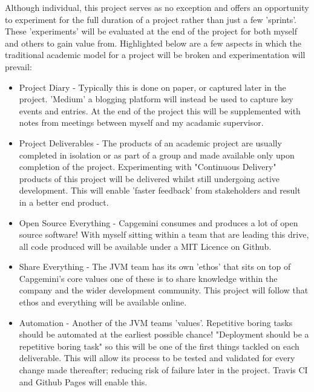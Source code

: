 Although individual, this project serves as no exception and offers an
opportunity to experiment for the full duration of a project rather than just a
few 'sprints'. These 'experiments' will be evaluated at the end of
the project for both myself and others to gain value from. Highlighted below
are a few aspects in which the traditional academic model for a project will
be broken and experimentation will prevail:
 \begin{itemize}
  \item Project Diary - Typically this is done on paper, or captured later in
   the project. 'Medium' a blogging platform will instead be used to
   capture key events and entries. At the end of the project this will be
   supplemented with notes from meetings between myself and my acadamic
   supervisor.
  \item Project Deliverables - The products of an academic project are usually
  completed in isolation or as part of a group and made available only upon
  completion of the project. Experimenting with "Continuous Delivery"
  products of this project will be delivered whilst still undergoing active
  development. This will enable 'faster feedback' from stakeholders and
  result in a better end product.
  \item Open Source Everything - Capgemini consumes and
  produces a lot of open source software! With myself sitting within a team
  that are leading this drive, all code produced will be available under a MIT
  Licence on Github.
  \item Share Everything - The JVM team has its own 'ethos' that sits on top
  of Capgemini's core values one of these is to share knowledge within the
  company and the wider development community. This project will follow that
  ethos and everything will be available online.
  \item Automation - Another of the JVM teams 'values'. Repetitive boring tasks
  should be automated at the earliest possible chance! "Deployment should be a
   repetitive boring task" so this will be one of the first things tackled on
   each deliverable. This will allow its process to be tested and validated
   for every change made thereafter; reducing risk of failure later in the
   project. Travis CI and Github Pages will enable this.
 \end{itemize}

